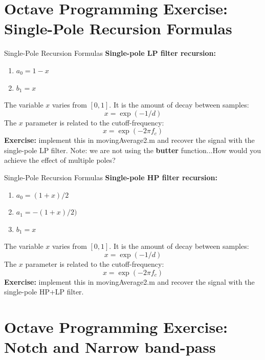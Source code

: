 \documentclass{beamer}
\begin{document}
\section{Octave Programming Exercise: Single-Pole Recursion Formulas}

\begin{frame}[fragile]{Single-Pole Recursion Formulas}
\textbf{Single-pole LP filter recursion:}
\begin{enumerate}
\item $a_0 = 1-x$
\item $b_1 = x$
\end{enumerate}
The variable $x$ varies from $[0,1]$.  It is the amount of decay between samples:
\begin{equation}
x = \exp(-1/d)
\end{equation}
The $x$ parameter is related to the cutoff-frequency:
\begin{equation}
x = \exp(-2\pi f_c)
\end{equation}
\textbf{Exercise:} implement this in movingAverage2.m and recover the signal with the single-pole LP filter.  Note: we are not using the \textbf{butter} function...How would you achieve the effect of multiple poles?
\end{frame}

\begin{frame}[fragile]{Single-Pole Recursion Formulas}
\textbf{Single-pole HP filter recursion:}
\begin{enumerate}
\item $a_0 = (1+x)/2$
\item $a_1 = -(1+x)/2)$
\item $b_1 = x$
\end{enumerate}
The variable $x$ varies from $[0,1]$.  It is the amount of decay between samples:
\begin{equation}
x = \exp(-1/d)
\end{equation}
The $x$ parameter is related to the cutoff-frequency:
\begin{equation}
x = \exp(-2\pi f_c)
\end{equation}
\textbf{Exercise:} implement this in movingAverage2.m and recover the signal with the single-pole HP+LP filter.
\end{frame}

\section{Octave Programming Exercise: Notch and Narrow band-pass}
\end{document}
